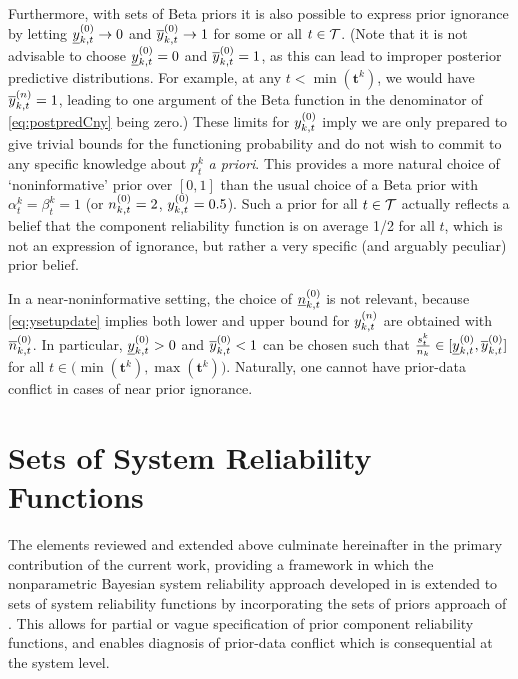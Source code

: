 \documentclass[12pt, a4paper]{elsarticle}
\newcommand{\bs}[1]{\boldsymbol{#1}}
\renewcommand{\vec}[1]{{\bs#1}}
\newcommand{\td}[1]{%
  \iftoggle{td}{%
    \todo[inline]{#1}%
  }{}%
}
\begin{document}
Furthermore, with sets of Beta priors it is also possible
to express prior ignorance
by letting $\underline{y}^{(0)}_{k,t} \to 0$ and $\overline{y}^{(0)}_{k,t} \to 1$
for some or all $t \in {\cal T}$.
(Note that it is not advisable to choose $\underline{y}^{(0)}_{k,t} = 0$ and $\overline{y}^{(0)}_{k,t} = 1$,
as this can lead to improper posterior predictive distributions.
For example, at any $t < \min(\vec{t}^k)$,
we would have $\overline{y}^{(n)}_{k,t} = 1$, leading to one argument of the Beta function
in the denominator of \eqref{eq:postpredCny} being zero.)
These limits for $y^{(0)}_{k,t}$ imply we are only prepared to give trivial bounds for the functioning probability
and do not wish to commit to any specific knowledge about $p^k_t$ \emph{a priori}.
This provides a more natural choice of `noninformative' prior over $[0,1]$ than the usual choice of
a Beta prior with $\alpha^k_t = \beta^k_t = 1$ (or $n^{(0)}_{k,t} = 2$, $y^{(0)}_{k,t} = 0.5$).
Such a prior for all $t \in {\cal T}$ actually reflects a belief that the component reliability function
is on average 1/2 for all $t$, which is not an expression of ignorance, but rather a very specific (and arguably peculiar) prior belief.

%
In a near-noninformative setting, the choice of $\underline{n}^{(0)}_{k,t}$ is not relevant,
because \eqref{eq:ysetupdate} implies both lower and upper bound for $y^{(n)}_{k,t}$ are obtained with $\overline{n}^{(0)}_{k,t}$.
In particular, $\underline{y}^{(0)}_{k,t} > 0$ and $\overline{y}^{(0)}_{k,t} < 1$ can be chosen such that
$\frac{s^k_t}{n_k} \in [\underline{y}^{(0)}_{k,t}, \overline{y}^{(0)}_{k,t}]$ for all $t \in \big(\min(\vec{t}^k), \max(\vec{t}^k)\big)$.
Naturally, one cannot have prior-data conflict in cases of near prior ignorance.


\section{Sets of System Reliability Functions}
\label{sec:setsofrel}

The elements reviewed and extended above culminate hereinafter in the primary contribution of the current work,
providing a framework in which the nonparametric Bayesian system reliability approach developed in \cite{2015:bayessurvsign}
is extended to sets of system reliability functions
by incorporating the sets of priors approach of \citet{2009:WalterAugustin}.
This allows for partial or vague specification of prior component reliability functions,
and enables diagnosis of prior-data conflict which is consequential at the system level.
\end{document}
